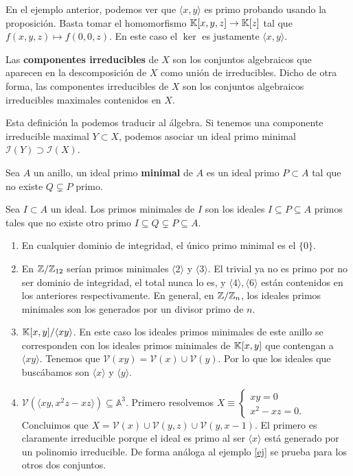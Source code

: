 \documentclass[ACGA.tex]{subfiles}
\begin{document}
\begin{ej}\label{ej}
En el ejemplo anterior, podemos ver que $\langle x,y\rangle$ es primo probando usando la proposición.  Basta tomar el homomorfismo $\mathbb{K}[x,y,z]\to\mathbb{K}[z]$ tal que $f(x,y,z)\mapsto f(0,0,z)$. En este caso el $\ker$ es justamente $\langle x,y\rangle$.
\end{ej}

\begin{defi}
Las \textbf{componentes irreducibles} de $X$ son los conjuntos algebraicos que aparecen en la descomposición de $X$ como unión de irreducibles. Dicho de otra forma, las componentes irreducibles de $X$ son los conjuntos algebraicos irreducibles maximales contenidos en $X$.
\end{defi}
Esta definición la podemos traducir al álgebra. Si tenemos una componente irreducible maximal $Y\subset X$, podemos asociar un ideal primo minimal $\mathcal{I}(Y)\supset\mathcal{I}(X)$.
\begin{defi}
Sea $A$ un anillo, un ideal primo \textbf{minimal} de $A$ es un ideal primo $P\subset A$ tal que no existe $Q\subsetneq P$ primo.
\end{defi}
\begin{defi}
Sea $I\subset A$ un ideal. Los primos minimales de $I$ son los ideales $I\subseteq P\subseteq A$ primos tales que no existe otro primo $I\subseteq Q\subsetneq P\subseteq A$.
\end{defi}

\begin{ej}
\begin{enumerate}
\item En cualquier dominio de integridad, el único primo minimal es el $\{0\}$. 
\item En $\mathbb{Z}/\mathbb{Z}_{12}$ serían primos minimales $\langle 2\rangle$ y $\langle 3\rangle$. El trivial ya no es primo por no ser dominio de integridad, el total nunca lo es, y $\langle 4\rangle,\langle 6\rangle$ están contenidos en los anteriores respectivamente. En general, en $\mathbb{Z}/\mathbb{Z}_{n}$, los ideales primos minimales son los generados por un divisor primo de $n$. 
\item $\mathbb{K}[x,y]/\langle xy\rangle$. En este caso los ideales primos minimales de este anillo se corresponden con los ideales primos minimales de $\mathbb{K}[x,y]$ que contengan a $\langle xy\rangle$. Tenemos que $\mathcal{V}(xy)=\mathcal{V}(x)\cup\mathcal{V}(y)$. Por lo que los ideales que buscábamos son $\langle x\rangle$ y $\langle y\rangle$.
\item $\mathcal{V}(\langle xy,x^2z-xz\rangle)\subseteq\mathbb{A}^3$. Primero resolvemos $X\equiv\begin{cases}
xy=0\\
x^2-xz=0.
\end{cases}$ Concluimos que $X=\mathcal{V}(x)\cup\mathcal{V}(y,z)\cup\mathcal{V}(y,x-1)$. El primero es claramente irreducible porque el ideal es primo al ser $\langle x\rangle$ está generado por un polinomio irreducible. De forma análoga al ejemplo \ref{ej} se prueba para los otros dos conjuntos. 
\end{enumerate}
\end{ej}
\end{document}
